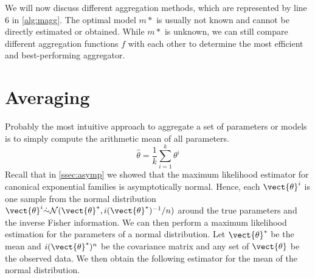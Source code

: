 We will now discuss different aggregation methods, which are represented by line 6 in \autoref{alg:magg}.
The optimal model $m*$ is usually not known and cannot be directly estimated or obtained.
While  $m*$ is unknown, we can still compare different aggregation functions $f$ with each other to determine the most efficient and best-performing aggregator.


\section{Averaging}

Probably the most intuitive approach to aggregate a set of parameters or models is to simply compute the  arithmetic mean of all parameters.
\begin{equation}
    \label{eq:arithmean}
    \hat{\theta} = \frac{1}{k} \sum_{i=1}^k \theta^i
\end{equation}
Recall that in \autoref{ssec:asymp} we showed that the maximum likelihood estimator for canonical exponential families is asymptotically normal.
Hence, each $\vect{\theta}^i$ is one sample from the normal distribution $\vect{\theta}^i \dot{\sim} \mathcal{N}(\vect{\theta}^*, i(\vect{\theta}^*)^{-1}/n)$ around the true parameters and the inverse Fisher information.
We can then perform a maximum likelihood estimation for the parameters of a normal distribution. 
Let $\vect{\theta}^*$ be the mean and $i(\vect{\theta}^*)^n$ be the covariance matrix and any set of $\vect{\theta}$ be the observed data.
We then obtain the following estimator for the mean of the normal distribution.
